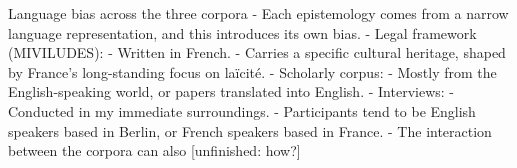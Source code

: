 Language bias across the three corpora
- Each epistemology comes from a narrow language representation, and this introduces its own bias.
- Legal framework (MIVILUDES):
    - Written in French.
    - Carries a specific cultural heritage, shaped by France's long-standing focus on laïcité.
- Scholarly corpus:
    - Mostly from the English-speaking world, or papers translated into English.
- Interviews:
    - Conducted in my immediate surroundings.
    - Participants tend to be English speakers based in Berlin, or French speakers based in France.
- The interaction between the corpora can also [unfinished: how?]

